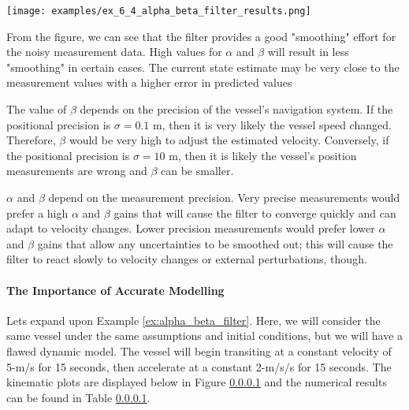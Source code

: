 \begin{example}
\begin{center}
\begin{tabular}{c | c | c | c | c | c}
            \bottomrule
            \end{tabular}
        \end{center}

        \begin{center}
            \texttt{[image: examples/ex\_6\_4\_alpha\_beta\_filter\_results.png]}
        \end{center}

        From the figure, we can see that the filter provides a good "smoothing" effort for the noisy measurement data.
        High values for $\alpha$ and $\beta$ will result in less "smoothing" in certain cases.
        The current state estimate may be very close to the measurement values with a higher error in predicted values

        The value of $\beta$ depends on the precision of the vessel's navigation system.
        If the positional precision is $\sigma = 0.1 \text{ m}$, then it is very likely the vessel speed changed.
        Therefore, $\beta$ would be very high to adjust the estimated velocity.
        Conversely, if the positional precision is $\sigma = 10 \text{ m}$, then it is likely the vessel's position measurements are wrong and $\beta$ can be smaller.

        $\alpha$ and $\beta$ depend on the measurement precision.
        Very precise measurements would prefer a high $\alpha$ and $\beta$ gains that will cause the filter to converge quickly and can adapt to velocity changes.
        Lower precision measurements would prefer lower $\alpha$ and $\beta$ gains that allow any uncertainties to be smoothed out; this will cause the filter to react slowly to velocity changes or external perturbations, though.
        
        \end{example}


        \paragraph{The Importance of Accurate Modelling} Lets expand upon Example \ref{ex:alpha_beta_filter}.
        Here, we will consider the same vessel under the same assumptions and initial conditions, but we will have a flawed dynamic model.
        The vessel will begin transiting at a constant velocity of 5-m/s for 15 seconds, then accelerate at a constant 2-m/s/s for 15 seconds.
        The kinematic plots are displayed below in Figure \ref{} and the numerical results can be found in Table \ref{}.

